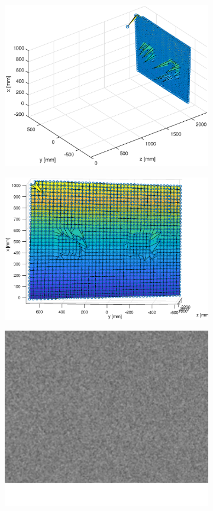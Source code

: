 \begin{figure}[h!]
\begin{subfigure}[t]{0.20\linewidth}
		\includegraphics[width=1\linewidth]{figures/part2/test2_scan}
	\end{subfigure}
	\begin{subfigure}[t]{0.20\linewidth}
		\centering
		\includegraphics[width=1\linewidth]{figures/part2/test2_scan1}
	\end{subfigure}
	\begin{subfigure}[t]{0.18\linewidth}
		\centering
		\includegraphics[width=0.8\linewidth]{figures/part2/test_left_3}

\end{subfigure}
\end{figure}
